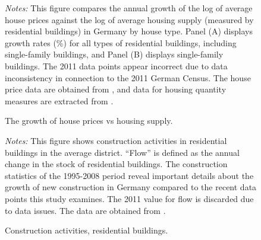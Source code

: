 \documentclass[
  12pt,
]{article}
\begin{document}
\begin{figure}
\begin{minipage}{0.50\linewidth}
\end{minipage}%

\caption{\label{fig-price-quantity-growth}The growth of house prices vs
housing supply.}
\begin{minipage}{0.975\textwidth}
\small
\emph{Notes:} This figure
compares the annual growth of the log of average house prices against
the log of average housing supply (measured by residential buildings) in
Germany by house type. Panel (A) displays growth rates (\%) for all
types of residential buildings, including single-family buildings, and
Panel (B) displays single-family buildings. The 2011 data points appear
incorrect due to data inconsistency in connection to the 2011 German
Census. The house price data are obtained from \citet{rwi_redhk_2020},
and data for housing quantity measures are extracted from
\citet{atlasde_2022}.
\end{minipage}


\end{figure}%

\begin{figure}


\caption{\label{fig-construction-activities}Construction activities,
residential buildings.}
\begin{minipage}{0.975\textwidth}
\small
\emph{Notes:} This
figure shows construction activities in residential buildings in the
average district. ``Flow'' is defined as the annual change in the stock
of residential buildings. The construction statistics of the 1995-2008
period reveal important details about the growth of new construction in
Germany compared to the recent data points this study examines. The 2011
value for flow is discarded due to data issues. The data are obtained
from \citet{atlasde_2022}.
\end{minipage}


\end{figure}%
\end{document}
